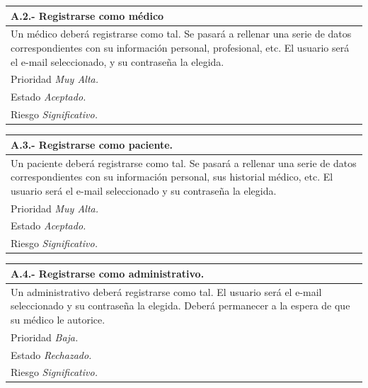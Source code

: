\documentclass[a4paper,oneside,11pt]{book}
\begin{document}
\begin{center}
\begin{tabulary}{15cm}{|L|}
	\hline
		\bf{A.2.- Registrarse como médico} \\
	\hline
		Un médico deberá registrarse como tal. Se pasará a rellenar una serie de datos correspondientes con su información personal, profesional, etc. El usuario será el e-mail seleccionado, y su contraseña la elegida.\\
	\hline
		Prioridad \textit{Muy Alta.} \\
	\hline
		Estado \textit{Aceptado.} \\
	\hline
		Riesgo \textit{Significativo.} \\
	\hline
\end{tabulary}
\end{center}

\begin{center}
\begin{tabulary}{15cm}{|L|}
	\hline
		\bf{A.3.- Registrarse como paciente.} \\
	\hline
		Un paciente deberá registrarse como tal. Se pasará a rellenar una serie de datos correspondientes con su información personal, sus historial médico, etc. El usuario será el e-mail seleccionado y su contraseña la elegida. \\
	\hline
		Prioridad \textit{Muy Alta.} \\
	\hline
		Estado \textit{Aceptado.} \\
	\hline
		Riesgo \textit{Significativo.} \\
	\hline
\end{tabulary}
\end{center}

\begin{center}
\begin{tabulary}{15cm}{|L|}
	\hline
		\bf{A.4.- Registrarse como administrativo.} \\
	\hline
		Un administrativo deberá registrarse como tal. El usuario será el e-mail seleccionado y su contraseña la elegida. Deberá permanecer a la espera de que su médico le autorice. \\
	\hline
		Prioridad \textit{Baja.} \\
	\hline
		Estado \textit{Rechazado.} \\
	\hline
		Riesgo \textit{Significativo.} \\
	\hline
\end{tabulary}
\end{center}
\end{document}
